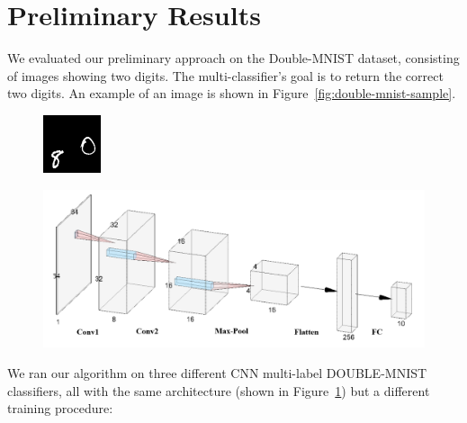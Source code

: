 
\section{Preliminary Results}
We evaluated our preliminary approach on the Double-MNIST dataset, consisting of images showing two digits.
The multi-classifier's goal is to return the correct two digits. %
An example of an image is shown in Figure~\ref{fig:double-mnist-sample}. %
\begin{figure}
\centering
\begin{minipage}{.4\textwidth}
  \centering
  \includegraphics[width=0.6\linewidth]{108_80.png}
   \label{fig:double-mnist-sample}
\end{minipage}%
\begin{minipage}{.6\textwidth}
  \centering
  \includegraphics[width=1\linewidth]{arch_labeled.png}
  \label{fig:arch_labeled}
\end{minipage}
\end{figure}
We ran our algorithm on three different CNN multi-label DOUBLE-MNIST classifiers, all with the same architecture (shown in Figure~\ref{fig:arch_labeled}) but a different training procedure:

